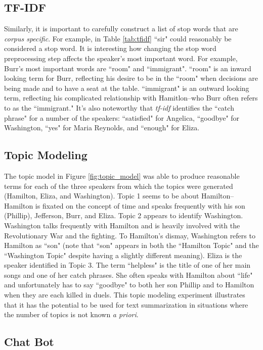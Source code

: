 \documentclass{article}
\begin{document}
\subsection{TF-IDF}

Similarly, it is important to carefully construct a list of stop words that are \emph{corpus specific}. For example, in Table \ref{tab:tfidf} ``sir" could reasonably be considered a stop word. It is interesting how changing the stop word preprocessing step affects the speaker's most important word. For example, Burr's most important words are ``room" and ``immigrant". ``room" is an inward looking term for Burr, reflecting his desire to be in the ``room" when decisions are being made and to have a seat at the table. ``immigrant" is an outward looking term, reflecting his complicated relationship with Hamitlon--who Burr often refers to as the ``immigrant." It's also noteworthy that \emph{tf-idf} identifies the ``catch phrase" for a number of the speakers: ``satisfied" for Angelica, ``goodbye" for Washington, ``yes" for Maria Reynolds, and ``enough" for Eliza.  

\subsection{Topic Modeling}

The topic model in Figure \ref{fig:topic_model} was able to produce reasonable terms for each of the three speakers from which the topics were generated (Hamilton, Eliza, and Washington). Topic 1 seems to be about Hamilton--Hamilton is fixated on the concept of time and speaks frequently with his son (Phillip), Jefferson, Burr, and Eliza. Topic 2 appears to identify Washington. Washington talks frequently with Hamilton and is heavily involved with the Revolutionary War and the fighting. To Hamilton's dismay, Washington refers to Hamilton as ``son" (note that ``son" appears in both the ``Hamilton Topic" and the ``Washington Topic" despite having a slightly different meaning). Eliza is the speaker identified in Topic 3. The term ``helpless" is the title of one of her main songs and one of her catch phrases. She often speaks with Hamilton about ``life" and unfortunately has to say ``goodbye" to both her son Phillip and to Hamilton when they are each killed in duels. This topic modeling experiment illustrates that it has the potential to be used for text summarization in situations where the number of topics is not known \emph{a priori}.

\subsection{Chat Bot}
\end{document}
